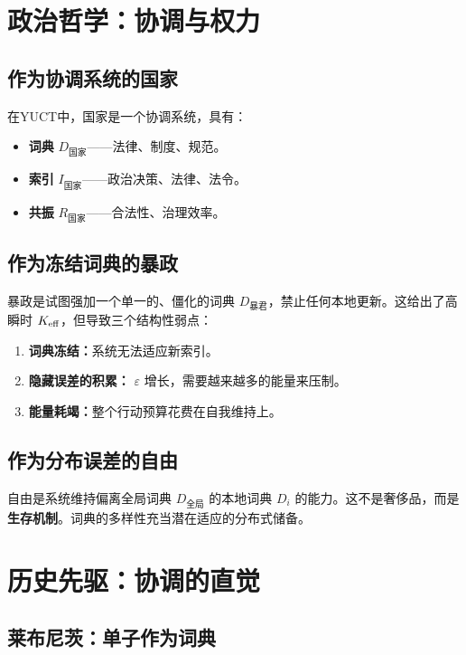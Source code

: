 \documentclass[11pt,a4paper]{article}
\newcommand{\eps}{\varepsilon}
\begin{document}
	\section{政治哲学：协调与权力}
	
	\subsection{作为协调系统的国家}
	
	在YUCT中，国家是一个协调系统，具有：
	
	\begin{itemize}
		\item \textbf{词典} \(D_{\text{国家}}\)——法律、制度、规范。
		\item \textbf{索引} \(I_{\text{国家}}\)——政治决策、法律、法令。
		\item \textbf{共振} \(R_{\text{国家}}\)——合法性、治理效率。
	\end{itemize}
	
	\subsection{作为冻结词典的暴政}
	
	暴政是试图强加一个单一的、僵化的词典 \(D_{\text{暴君}}\)，禁止任何本地更新。这给出了高瞬时 \(\Keff\)，但导致三个结构性弱点：
	
	\begin{enumerate}
		\item \textbf{词典冻结：}系统无法适应新索引。
		\item \textbf{隐藏误差的积累：} \(\eps\) 增长，需要越来越多的能量来压制。
		\item \textbf{能量耗竭：}整个行动预算花费在自我维持上。
	\end{enumerate}
	
	\subsection{作为分布误差的自由}
	
	自由是系统维持偏离全局词典 \(D_{\text{全局}}\) 的本地词典 \(D_i\) 的能力。这不是奢侈品，而是\textbf{生存机制}。词典的多样性充当潜在适应的分布式储备。
	
	\section{历史先驱：协调的直觉}
	
	\subsection{莱布尼茨：单子作为词典}
	
\end{document}
